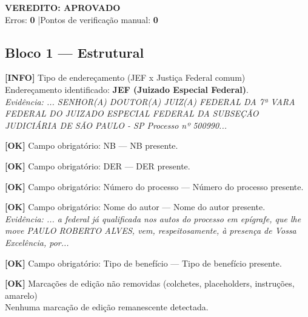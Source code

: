 \documentclass[12pt,a4paper]{article}
\newcommand{\statusOK}[1]{\textcolor{corOK}{\textbf{[OK]}} #1}
\newcommand{\statusINFO}[1]{\textcolor{corINFO}{\textbf{[INFO]}} #1}
\begin{document}
\vspace{0.5em}

\noindent\colorbox{corFundoAprovado}{%
  \begin{minipage}{\dimexpr\linewidth-2\fboxsep}
    \centering
    \vspace{0.3em}
    {\large \textcolor{corOK}{\textbf{VEREDITO: APROVADO}}}\\
    Erros: \textbf{0} \quad|\quad Pontos de verificação manual: \textbf{0}
    \vspace{0.3em}
  \end{minipage}%
}

\vspace{1em}


\subsection{Bloco 1 --- Estrutural}

\statusINFO{Tipo de endereçamento (JEF x Justiça Federal comum)}\\
Endereçamento identificado: \textbf{JEF (Juizado Especial Federal)}.\\
\textit{Evidência: ... SENHOR(A) DOUTOR(A) JUIZ(A) FEDERAL DA 7ª VARA FEDERAL DO JUIZADO ESPECIAL FEDERAL DA SUBSEÇÃO JUDICIÁRIA DE SÃO PAULO - SP Processo nº 500990...}

\medskip
\statusOK{Campo obrigatório: NB} --- NB presente.

\medskip
\statusOK{Campo obrigatório: DER} --- DER presente.

\medskip
\statusOK{Campo obrigatório: Número do processo} --- Número do processo presente.

\medskip
\statusOK{Campo obrigatório: Nome do autor} --- Nome do autor presente.\\
\textit{Evidência: ... a federal já qualificada nos autos do processo em epígrafe, que lhe move PAULO ROBERTO ALVES, vem, respeitosamente, à presença de Vossa Excelência, por...}

\medskip
\statusOK{Campo obrigatório: Tipo de benefício} --- Tipo de benefício presente.

\medskip
\statusOK{Marcações de edição não removidas (colchetes, placeholders, instruções, amarelo)}\\
Nenhuma marcação de edição remanescente detectada.
\end{document}
